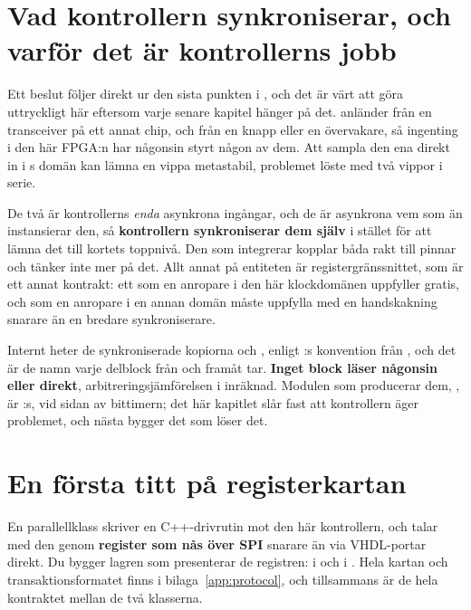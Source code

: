 \section{Vad kontrollern synkroniserar, och varför det är kontrollerns jobb}
\label{c11:sec:sync}

Ett beslut följer direkt ur den sista punkten i , och det är värt att göra
uttryckligt här eftersom varje senare kapitel hänger på det.  anländer från en
transceiver på ett annat chip, och  från en knapp eller en övervakare, så ingenting i
den här FPGA:n har någonsin styrt någon av dem. Att sampla den ena direkt in i s domän
kan lämna en vippa metastabil, problemet  löste med två vippor i serie.

De två är kontrollerns \emph{enda} asynkrona ingångar, och de är asynkrona vem som än instansierar
den, så \textbf{kontrollern synkroniserar dem själv} i stället för att lämna det till kortets
toppnivå. Den som integrerar kopplar båda rakt till pinnar och tänker inte mer på det. Allt annat på
entiteten är registergränssnittet, som är ett annat kontrakt: ett som en anropare i den här
klockdomänen uppfyller gratis, och som en anropare i en annan domän måste uppfylla med en
handskakning snarare än en bredare synkroniserare.

Internt heter de synkroniserade kopiorna  och , enligt
:s konvention från , och det är de namn varje delblock från
 och framåt tar. \textbf{Inget block läser någonsin  eller
 direkt}, arbitreringsjämförelsen i  inräknad. Modulen som producerar
dem, , är :s, vid sidan av bittimern; det här kapitlet slår fast att
kontrollern äger problemet, och nästa bygger det som löser det.

\section{En första titt på registerkartan}
\label{c11:sec:regmap}

En parallellklass skriver en C++-drivrutin mot den här kontrollern, och talar med den genom
\textbf{register som nås över SPI} snarare än via VHDL-portar direkt. Du bygger lagren som
presenterar de registren:  i  och  i
. Hela kartan och transaktionsformatet finns i bilaga~\ref{app:protocol}, och
tillsammans är de hela kontraktet mellan de två klasserna.

